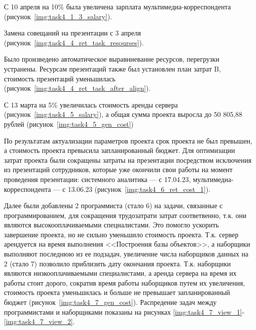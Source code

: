 С 10 апреля на 10\% была увеличена зарплата мультимедиа-корреспондента (рисунок~\ref{img:task4_1_3_salary}).

Замена совещаний на презентации с 3 апреля (рисунок~\ref{img:task4_4_ret_task_resourses}).

Было произведено автоматическое выравниевание ресурсов, перегрузки устранены.
Ресурсам презентаций также был установлен план затрат B,
стоимость презентаций уменьшилась (рисунок~\ref{img:task4_4_ret_task_after_align}).

С 13 марта на 5\% увеличилась стоимость аренды сервера (рисунок~\ref{img:task4_5_salary}), 
а общая сумма проекта выросла до 50 805,88 рублей (рисунок~\ref{img:task4_5_gen_cost})


По результатам актуализации параметров проекта срок проекта не был превышен, а стоимость проекта превысила запланированный бюджет.
Для оптимизации затрат проекта были сокращены затраты на презентации посредством исключения из презентаций сотрудников, которые уже 
окончили свои работы на момент проведения презентации: системного аналитика --- с 17.04.23, мультимедиа-корреспондента --- с 13.06.23 
(рисунок~\ref{img:task4_6_ret_cost_1}).

Далее были добавлены 2 программиста (стало 6) на задачи,  связанные с программированием, для сокращения трудозатрати затрат соответвенно,
т.к. они  являются высокооплачиваемыми специалистами. Это помогло ускорить завершение проекта, но не сильно уменьшило стоимость проекта.
Т.к. сервер арендуется на время выполнения <<Построения базы объектов>>, а наборщики выполняют последнюю из ее подзадач, увеличение числа
наборщиков данных на 2 (стало 7) позволило приблизить дату окончания проекта. Т.к. наборщики являются низкооплачиваемыми специалистами, а 
аренда сервера на время их работы стоит дорого, сократив время работы наборщиков путем их увеличения, стоимость проекта уменьшилась и больше 
не превышает запланированный бюджет (рисунок~\ref{img:task4_7_gen_cost}). Распредение задач между программистами и наборщиками показаны 
на рисунках \ref{img:task4_7_view_1}-\ref{img:task4_7_view_2}.

